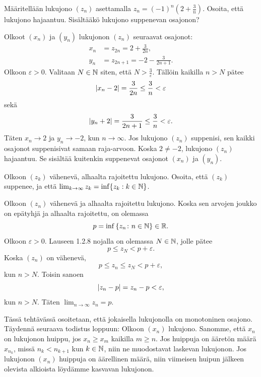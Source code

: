 \documentclass[11pt,a4paper]{amsart}
\begin{document}
\begin{exercise}
Määritellään lukujono \((z_n)\) asettamalla
\(z_n = (-1)^n\left(2 + \frac{3}{n}\right)\). Osoita, että lukujono
hajaantuu. Sisältääkö lukujono suppenevan osajonon?
\end{exercise}

\begin{solution}
Olkoot \((x_n)\) ja \((y_n)\) lukujonon \((z_n)\) seuraavat osajonot:
\[
\begin{aligned}
x_n &= z_{2n} = 2 + \frac{3}{2n}, \\
y_n &= z_{2n + 1} = -2 - \frac{3}{2n + 1}.
\end{aligned}
\]
Olkoon \(\varepsilon > 0\). Valitaan \(N \in \mathbb{N}\) siten, että
\(N > \frac{3}{\varepsilon}\). Tällöin kaikilla \(n > N\) pätee
\[
\lvert x_n - 2\rvert = \frac{3}{2n} \leq \frac{3}{n} < \varepsilon
\]
sekä
\[
\lvert y_n + 2\rvert = \frac{3}{2n + 1} \leq \frac{3}{n} < \varepsilon.
\]
Täten \(x_n \to 2\) ja \(y_n \to -2\), kun \(n \to \infty\).
Jos lukujono \((z_n)\) suppenisi, sen kaikki osajonot suppenisivat samaan
raja-arvoon. Koska \(2 \neq -2\), lukujono \((z_n)\) hajaantuu.
Se sisältää kuitenkin suppenevat osajonot \((x_n)\) ja \((y_n)\).
\end{solution}

\begin{exercise}
Olkoon \((z_k)\) vähenevä, alhaalta rajoitettu lukujono. Osoita, että
\((z_k)\) suppenee, ja että
\(\lim_{k \to \infty} z_k = \inf\{z_k : k \in \mathbb{N}\}\).
\end{exercise}

\begin{solution}
Olkoon \((z_n)\) vähenevä ja alhaalta rajoitettu lukujono. Koska sen arvojen
joukko on epätyhjä ja alhaalta rajoitettu, on olemassa
\[
p = \inf{\left\lbrace z_n \colon n \in \mathbb{N}\right\rbrace} \in \mathbb{R}.
\]
Olkoon \(\varepsilon > 0\). Lauseen 1.2.8 nojalla on olemassa \(N \in \mathbb{N}\),
jolle pätee
\[
p \leq z_N < p + \varepsilon.
\]
Koska \((z_n)\) on vähenevä,
\[
p \leq z_n \leq z_N < p + \varepsilon,
\]
kun \(n > N\). Toisin sanoen
\[
\lvert z_n - p\rvert = z_n - p < \varepsilon,
\]
kun \(n > N\). Täten \(\lim_{n \to \infty} z_n = p\).
\end{solution}

\begin{exercise}
Tässä tehtävässä osoitetaan, että jokaisella lukujonolla on monotoninen
osajono. Täydennä seuraava todistus loppuun: Olkoon \((x_n)\) lukujono.
Sanomme, että \(x_n\) on lukujonon huippu, jos \(x_n \geq x_m\) kaikilla
\(m \geq n\). Jos huippuja on ääretön määrä \(x_{n_k}\), missä
\(n_k < n_{k+1}\) kun \(k \in \mathbb{N}\), niin ne muodostavat laskevan
lukujonon. Jos lukujonon \((x_n)\) huippuja on äärellinen määrä, niin
viimeisen huipun jälkeen olevista alkioista löydämme kasvavan lukujonon.
\end{exercise}
\end{document}
